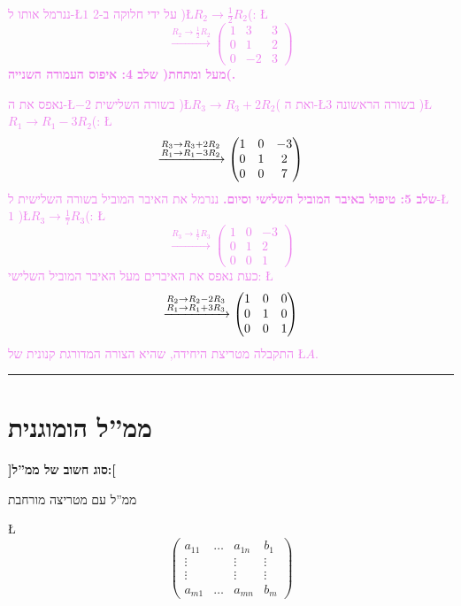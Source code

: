 \documentclass[english,hebrew]{article}
\begin{document}
\textcolor{violet}{ננרמל אותו ל-\L{$1$} על ידי חלוקה ב-2 )\L{$R_{2}\to\frac{1}{2}R_{2}$}(:
\L{%
\[
\xrightarrow{R_{2}\to\frac{1}{2}R_{2}}\begin{pmatrix}1 & 3 & 3\\
0 & 1 & 2\\
0 & -2 & 3
\end{pmatrix}
\]
}%
}\textbf{\textcolor{violet}{שלב 4: איפוס העמודה השנייה )מעל ומתחת(.}}

\textcolor{violet}{נאפס את ה-\L{$-2$} בשורה השלישית )\L{$R_{3}\to R_{3}+2R_{2}$}(
ואת ה-\L{$3$} בשורה הראשונה )\L{$R_{1}\to R_{1}-3R_{2}$}(: \L{%
\[
\xrightarrow{\begin{subarray}{l}
R_{3}\to R_{3}+2R_{2}\\
R_{1}\to R_{1}-3R_{2}
\end{subarray}}\begin{pmatrix}1 & 0 & -3\\
0 & 1 & 2\\
0 & 0 & 7
\end{pmatrix}
\]
}%
}\textbf{\textcolor{violet}{שלב 5: טיפול באיבר המוביל השלישי וסיום.}}\textcolor{violet}{{}
ננרמל את האיבר המוביל בשורה השלישית ל-\L{$1$} )\L{$R_{3}\to\frac{1}{7}R_{3}$}(:
\L{%
\[
\xrightarrow{R_{3}\to\frac{1}{7}R_{3}}\begin{pmatrix}1 & 0 & -3\\
0 & 1 & 2\\
0 & 0 & 1
\end{pmatrix}
\]
}%
כעת נאפס את האיברים מעל האיבר המוביל השלישי: \L{%
\[
\xrightarrow{\begin{subarray}{l}
R_{2}\to R_{2}-2R_{3}\\
R_{1}\to R_{1}+3R_{3}
\end{subarray}}\begin{pmatrix}1 & 0 & 0\\
0 & 1 & 0\\
0 & 0 & 1
\end{pmatrix}
\]
}%
התקבלה מטריצת היחידה, שהיא הצורה המדורגת קנונית של \L{$A$}.}

\rule{1\linewidth}{1.5pt}

\section{ממ\textquotedblright ל הומוגנית}

\textbf{{]}סוג חשוב של ממ\textquotedblright ל:{[}}

ממ\textquotedblright ל עם מטריצה מורחבת

\L{%
\[
\left(\begin{array}{ccc|c}
a_{11} & \dots & a_{1n} & b_{1}\\
\vdots &  & \vdots & \vdots\\
\vdots &  & \vdots & \vdots\\
a_{m1} & \dots & a_{mn} & b_{m}
\end{array}\right)
\]
}%
\end{document}
